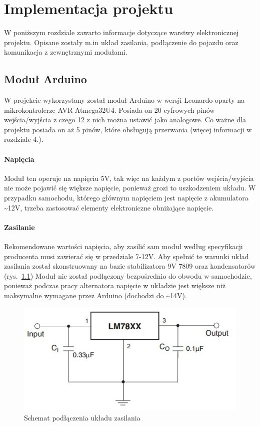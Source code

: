 \chapter{Implementacja projektu}
W poniższym rozdziale zawarto informacje dotyczące warstwy elektronicznej projektu. Opisane zostały m.in układ zasilania, podłączenie do pojazdu oraz komunikacja z zewnętrznymi modułami.
\section{Moduł Arduino}
W projekcie wykorzystany został moduł Arduino w wersji Leonardo oparty na mikrokontrolerze AVR Atmega32U4. Posiada on 20 cyfrowych pinów wejścia/wyjścia z czego 12 z nich można ustawić jako analogowe. Co ważne dla projektu posiada on aż 5 pinów, które obsługują przerwania (więcej informacji w rozdziale 4.).
\subsubsection{Napięcia}
Moduł ten operuje na napięciu 5V, tak więc na każdym z portów wejścia/wyjścia nie może pojawić się większe napięcie, ponieważ grozi to uszkodzeniem układu. W przypadku samochodu, którego głównym napięciem jest napięcie z akumulatora \textasciitilde12V, trzeba zastosować elementy elektroniczne obniżające napięcie.
\subsubsection{Zasilanie}
Rekomendowane wartości napięcia, aby zasilić sam moduł według specyfikacji producenta musi zawierać się w przedziale 7-12V. Aby spełnić te warunki układ zasilania został skonstruowany na bazie stabilizatora 9V 7809 oraz kondensatorów (rys.~\ref{fig:LM78XX}) Moduł nie został podłączony bezpośrednio do obwodu w samochodzie, ponieważ podczas pracy alternatora napięcie w układzie jest większe niż maksymalne wymagane przez Arduino (dochodzi do \textasciitilde14V).

\begin{figure}[!htb]
\centering
\includegraphics[width=0.7\linewidth]{Rysunki/78xx.jpg}
\caption{Schemat podłączenia układu zasilania \cite{LM78XX}}
\label{fig:LM78XX}
\end{figure}

